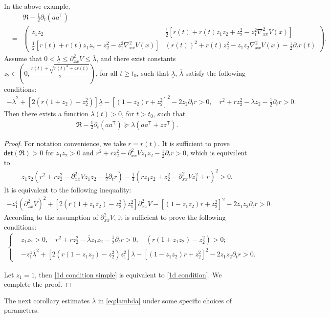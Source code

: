 \documentclass[11pt,reqno]{amsart}
\newcommand{\ts}{\mathsf{T}}
\newcommand{\bea}{\begin{eqnarray}}
\newcommand{\eea}{\end{eqnarray}}
\newcommand{\beaa}{\begin{eqnarray*}}
\newcommand{\eeaa}{\end{eqnarray*}}
\def\q{\quad}
\def\pa{\partial}
\def\qed{ \hfill \vrule width.25cm height.25cm depth0cm\smallskip}
\begin{document}
\begin{proposition}\label{prop: underdamped} In the above example,
\beaa 
&&\mathfrak R-\frac{1}{2}\partial_t (aa^{\ts})\\
&=& \begin{pmatrix}
	 z_1z_2 & \frac{1}{2}[r(t)+r(t)z_1z_2+z_2^2-z_1^2\nabla^2_{xx}V(x) ]\\
	 \frac{1}{2}[r(t)+r(t)z_1z_2+z_2^2-z_1^2\nabla^2_{xx}V(x) ] & (r(t))^2+r(t)z_2^2-z_1z_2 \nabla^2_{xx}V(x)-\frac{1}{2}\partial_t r(t)
\end{pmatrix}.
\eeaa 
Assume that $0<\underline{\lambda} \le \pa_{xx}^2V\le \overline{\lambda}$, and there exist constants $z_2\in(0,\frac{r(t)+\sqrt{r(t)^2+4r(t)}}{2})$, for all $t\ge t_0$, such that $\underline{\lambda}$, $\overline{\lambda}$ satisfy the following conditions:
\bea \label{1d condition simple}
-\overline{\lambda}^2+[2(r(1+z_2)-z_2^2)] \underline{\lambda}-[(1-z_2)r+z_2^2]^2-2z_2\partial_tr>0,\q r^2+rz_2^2-\overline{\lambda} z_2-\frac{1}{2}\partial_t r>0.
\eea 
Then there exists a function $\lambda(t)>0$, for $t>t_0$, such that 
\bea\label{eq:lambda}
\mathfrak R-\frac{1}{2}\partial_t(aa^{\ts})\succeq \lambda (aa^{\ts}+zz^{\ts}).
\eea
\end{proposition}
\begin{proof}
 For notation convenience, we take $r=r(t)$.  It is sufficient to prove $\mathsf{det}(\mathfrak R)>0$ for $z_1z_2>0$ and  $r^2+rz_2^2-\partial^2_{xx} V z_1z_2-\frac{1}{2}\partial_t r>0$, which is equivalent to 
\beaa 
z_1z_2(r^2+rz_2^2-\partial^2_{xx} V z_1z_2-\frac{1}{2}\partial_t r)-\frac{1}{4}(rz_1z_2+z_2^2-\partial^2_{xx}V z_1^2+r)^2>0.
\eeaa 
It is equivalent to the following inequality:
\bea\label{1d condition general} 
-z_1^4(\pa_{xx}^2V)^2+[2(r(1+z_1z_2)-z_2^2)z_1^2] \pa_{xx}^2V-[(1-z_1z_2)r+z_2^2]^2-2z_1z_2\partial_t r>0.
\eea 
According to the assumption of $\pa_{xx}^2V$, it is sufficient to prove the following conditions: 
\bea\label{1d condition}
\begin{cases}
& z_1z_2>0,\q r^2+rz_2^2-\overline{\lambda} z_1z_2-\frac{1}{2}\partial_t r>0,\q   (r(1+z_1z_2)-z_2^2)>0;\\
&-z_1^4\overline{\lambda}^2+[2(r(1+z_1z_2)-z_2^2)z_1^2] \underline{\lambda}-[(1-z_1z_2)r+z_2^2]^2-2z_1z_2\partial_t r>0.
\end{cases}
\eea


Let $z_1=1$, then \eqref{1d condition simple} is equivalent to \eqref{1d condition}. We complete the proof.\qed 
\end{proof}
The next corollary estimates $\lambda$ in \eqref{eq:lambda} under some specific choices of parameters. 
\end{document}
